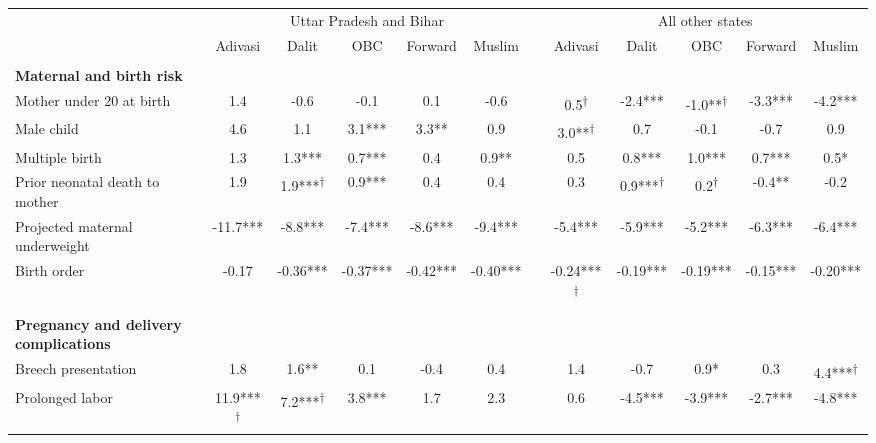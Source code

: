 \begin{tabular}{l*{5}{c}@{\hspace{1.4em}}c@{\hspace{1.4em}}*{5}{c}}
\toprule
& \multicolumn{5}{c}{Uttar Pradesh and Bihar} & & \multicolumn{5}{c}{All other states} \\
\cmidrule(lr){2-6} \cmidrule(lr){8-12}
\addlinespace[0.25em]
& \tiny Adivasi & \tiny Dalit & \tiny OBC & \tiny Forward & \tiny Muslim & & \tiny Adivasi & \tiny Dalit & \tiny OBC & \tiny Forward & \tiny Muslim \\
\midrule
&&&&&&&&&&&\\
\textbf{Maternal and birth risk}&&&&&&&&&&&\\
\hspace*{2em}Mother under 20 at birth&1.4&-0.6&-0.1&0.1&-0.6&&0.5\textsuperscript{\(\dagger\)}&-2.4***&-1.0**\textsuperscript{\(\dagger\)}&-3.3***&-4.2***\\
\hspace*{2em}Male child&4.6&1.1&3.1***&3.3**&0.9&&3.0**\textsuperscript{\(\dagger\)}&0.7&-0.1&-0.7&0.9\\
\hspace*{2em}Multiple birth&1.3&1.3***&0.7***&0.4&0.9**&&0.5&0.8***&1.0***&0.7***&0.5*\\
\hspace*{2em}Prior neonatal death to mother&1.9&1.9***\textsuperscript{\(\dagger\)}&0.9***&0.4&0.4&&0.3&0.9***\textsuperscript{\(\dagger\)}&0.2\textsuperscript{\(\dagger\)}&-0.4**&-0.2\\
\hspace*{2em}Projected maternal underweight&-11.7***&-8.8***&-7.4***&-8.6***&-9.4***&&-5.4***&-5.9***&-5.2***&-6.3***&-6.4***\\
\hspace*{2em}Birth order&-0.17&-0.36***&-0.37***&-0.42***&-0.40***&&-0.24***\textsuperscript{\(\dagger\)}&-0.19***&-0.19***&-0.15***&-0.20***\\
&&&&&&&&&&&\\
\textbf{Pregnancy and delivery complications}&&&&&&&&&&&\\
\hspace*{2em}Breech presentation&1.8&1.6**&0.1&-0.4&0.4&&1.4&-0.7&0.9*&0.3&4.4***\textsuperscript{\(\dagger\)}\\
\hspace*{2em}Prolonged labor&11.9***\textsuperscript{\(\dagger\)}&7.2***\textsuperscript{\(\dagger\)}&3.8***&1.7&2.3&&0.6&-4.5***&-3.9***&-2.7***&-4.8***\\

\end{tabular}
